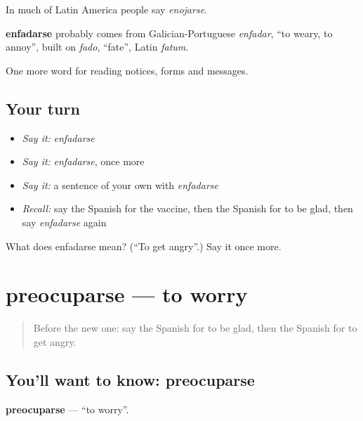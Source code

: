 In much of Latin America people say \emph{enojarse}.

\begin{cousinweb}
\textbf{enfadarse} probably comes from Galician-Portuguese \emph{enfadar}, \textquotedblleft{}to weary, to annoy\textquotedblright{}, built on \emph{fado}, \textquotedblleft{}fate\textquotedblright{}, Latin \emph{fatum}.
\end{cousinweb}

\begin{grammarlens}[title={What you've built}]
One more word for reading notices, forms and messages.
\end{grammarlens}

\subsection*{Your turn}
\begin{itemize}
\raggedright
  \item \emph{Say it:} \emph{enfadarse}
  \item \emph{Say it:} \emph{enfadarse}, once more
  \item \emph{Say it:} a sentence of your own with \emph{enfadarse}
  \item \emph{Recall:} say the Spanish for the vaccine, then the Spanish for to be glad, then say \emph{enfadarse} again
\end{itemize}

\begin{tcolorbox}[breakable,colback=teal!4,colframe=teal!35!black,title={Before you move on}]
What does enfadarse mean? (\textquotedblleft{}To get angry\textquotedblright{}.) Say it once more.
\end{tcolorbox}
\section[preocuparse]{preocuparse — to worry}

\label{lesson:ES-C487-preocuparse}



\begin{quote}
Before the new one: say the Spanish for to be glad, then the Spanish for to get angry.
\end{quote}

\subsection*{You'll want to know: preocuparse}
\textbf{preocuparse} — \textquotedblleft{}to worry\textquotedblright{}.

